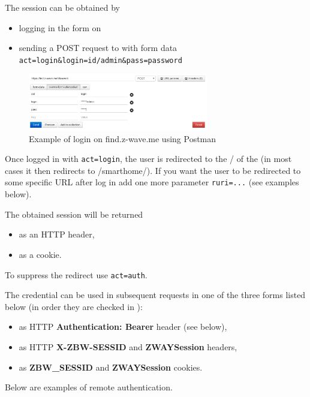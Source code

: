 The session can be obtained by
\begin{itemize}
\item logging in the form on 
\item sending a POST request to  with form data \texttt{act=login\&login=id/admin\&pass=password}
\end{itemize}

\begin{figure}
\begin{center}
\includegraphics[width=0.7\textwidth]{pngs/cap13/find-login-postman.png}
\caption{Example of login on find.z-wave.me using Postman}
\label{authenticatioln_remote_find}
\end{center}
\end{figure}

Once logged in with \texttt{act=login}, the user is redirected to the / of the \zway (in most cases it then redirects to /smarthome/).
If you want the user to be redirected to some specific URL after log in add one more parameter \texttt{ruri=...} (see examples below).

The obtained session will be returned
\begin{itemize}
\item as an HTTP header,
\item as a cookie.
\end{itemize}

To suppress the redirect use \texttt{act=auth}.

The credential can be used in subsequent requests in one of the three forms listed below (in order they are checked in \zway):
\begin{itemize}
\item as HTTP \textbf{Authentication: Bearer} header (see below),
\item as HTTP \textbf{X-ZBW-SESSID} and \textbf{ZWAYSession} headers,
\item as \textbf{ZBW\_SESSID} and \textbf{ZWAYSession} cookies.
\end{itemize}

Below are examples of remote authentication.

